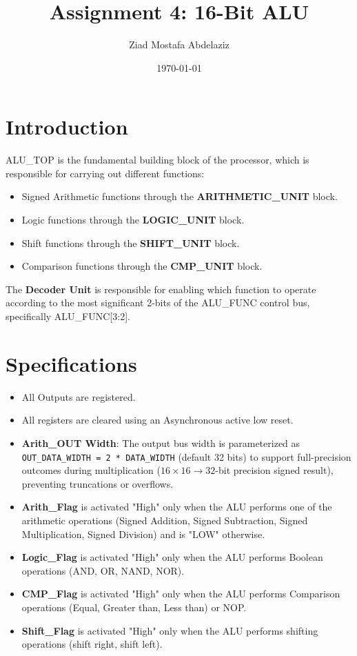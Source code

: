 \documentclass[11pt]{article}
\title{Assignment 4: 16-Bit ALU}
\author{Ziad Mostafa Abdelaziz}
\date{\today}
\begin{document}
\maketitle

\section{Introduction}
ALU\_TOP is the fundamental building block of the processor, which is responsible for carrying out different functions:
\begin{itemize}
    \item Signed Arithmetic functions through the \textbf{ARITHMETIC\_UNIT} block.
    \item Logic functions through the \textbf{LOGIC\_UNIT} block.
    \item Shift functions through the \textbf{SHIFT\_UNIT} block.
    \item Comparison functions through the \textbf{CMP\_UNIT} block.
\end{itemize}
The \textbf{Decoder Unit} is responsible for enabling which function to operate according to the most significant 2-bits of the ALU\_FUNC control bus, specifically ALU\_FUNC[3:2].

\section{Specifications}
\begin{itemize}
    \item All Outputs are registered.
    \item All registers are cleared using an Asynchronous active low reset.
    \item \textbf{Arith\_OUT Width}: The output bus width is parameterized as \texttt{OUT\_DATA\_WIDTH = 2 * DATA\_WIDTH} (default 32 bits) to support full-precision outcomes during multiplication ($16\times 16 \rightarrow 32$-bit precision signed result), preventing truncations or overflows.
    \item \textbf{Arith\_Flag} is activated "High" only when the ALU performs one of the arithmetic operations (Signed Addition, Signed Subtraction, Signed Multiplication, Signed Division) and is "LOW" otherwise.
    \item \textbf{Logic\_Flag} is activated "High" only when the ALU performs Boolean operations (AND, OR, NAND, NOR).
    \item \textbf{CMP\_Flag} is activated "High" only when the ALU performs Comparison operations (Equal, Greater than, Less than) or NOP.
    \item \textbf{Shift\_Flag} is activated "High" only when the ALU performs shifting operations (shift right, shift left).
\end{itemize}
\end{document}
